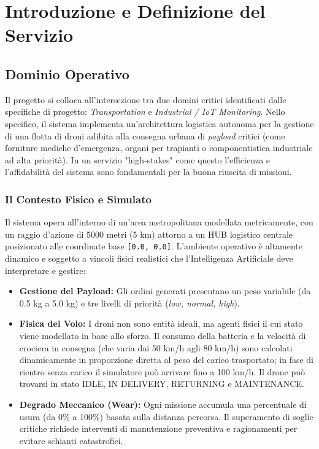 
\chapter{Introduzione e Definizione del Servizio}
\label{cap:introduzione_definizione}

\section{Dominio Operativo}
\label{sec:dominio_operativo}

Il progetto si colloca all'intersezione tra due domini critici identificati dalle specifiche di progetto: \textit{Transportation} e \textit{Industrial / IoT Monitoring}. %
Nello specifico, il sistema implementa un'architettura logistica autonoma per la gestione di una flotta di droni adibita alla consegna urbana di \textit{payload} critici (come forniture mediche d'emergenza, organi per trapianti o componentistica industriale ad alta priorità). %
In un servizio "high-stakes" come questo l'efficienza e l'affidabilità del sistema sono fondamentali per la buona riuscita di missioni. %

\subsection*{Il Contesto Fisico e Simulato}

Il sistema opera all'interno di un'area metropolitana modellata metricamente, con un raggio d'azione di 5000 metri (5 km) attorno a un HUB logistico centrale posizionato alle coordinate base \texttt{[0.0, 0.0]}. %
L'ambiente operativo è altamente dinamico e soggetto a vincoli fisici realistici che l'Intelligenza Artificiale deve interpretare e gestire: %

\begin{itemize}
    \item \textbf{Gestione del Payload:} Gli ordini generati presentano un peso variabile (da 0.5 kg a 5.0 kg) e tre livelli di priorità (\textit{low, normal, high}). %
    \item \textbf{Fisica del Volo:} I droni non sono entità ideali, ma agenti fisici il cui stato viene modellato in base allo sforzo. %
    Il consumo della batteria e la velocità di crociera in consegna (che varia dai 50 km/h agli 80 km/h) sono calcolati dinamicamente in proporzione diretta al peso del carico trasportato; in fase di rientro senza carico il simulatore può arrivare fino a 100 km/h. %
    Il drone può trovarsi in stato IDLE, IN DELIVERY, RETURNING e MAINTENANCE. %
    \item \textbf{Degrado Meccanico (Wear):} Ogni missione accumula una percentuale di usura (da 0\% a 100\%) basata sulla distanza percorsa. %
    Il superamento di soglie critiche richiede interventi di manutenzione preventiva e ragionamenti per evitare schianti catastrofici. %
\end{itemize}


